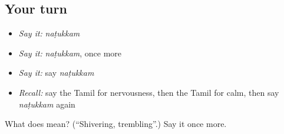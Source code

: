 \subsection*{Your turn}
\begin{itemize}
\raggedright
  \item \emph{Say it:} \emph{naṭukkam}
  \item \emph{Say it:} \emph{naṭukkam}, once more
  \item \emph{Say it:} say \emph{naṭukkam}
  \item \emph{Recall:} say the Tamil for nervousness, then the Tamil for calm, then say \emph{naṭukkam} again
\end{itemize}

\begin{tcolorbox}[breakable,colback=teal!4,colframe=teal!35!black,title={Before you move on}]
What does  mean? (\textquotedblleft{}Shivering, trembling\textquotedblright{}.) Say it once more.
\end{tcolorbox}
